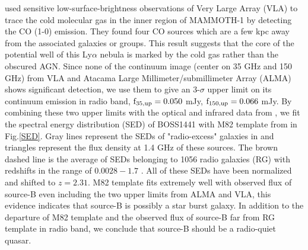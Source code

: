 \cite{emonts2019cold} used sensitive low-surface-brightness observations of Very Large Array (VLA) to trace the cold molecular gas in the inner region of MAMMOTH-1 by detecting the CO (1-0) emission. They found four CO sources which are a few kpc away from the associated galaxies or groups. This result suggests that the core of the potential well of this Ly$\alpha$ nebula is marked by the cold gas rather than the obscured AGN. Since none of the continuum image (center on 35 GHz and 150 GHz) from VLA and Atacama Large Millimeter/submillimeter Array (ALMA) shows significant detection, we use them to give an 3-$\sigma$ upper limit on its continuum emission in radio band, $\rm f_{35,up}=0.050$ mJy, $\rm f_{150,up}=0.066$ mJy. By combining these two upper limits with the optical and infrared data from \citet{arrigoni2018overdensity}, we fit the spectral energy distribution (SED) of BOSS1441 with M82 template from \cite{Silva_1998} in Fig.\ref{SED}. Gray lines represent the SEDs of "radio-excess" galaxies in \citet{harrison2014kiloparsec} and triangles represent the flux density at 1.4 GHz of these sources. The brown dashed line is the average of SEDs belonging to 1056 radio galaxies (RG) with redshifts in the range of $0.0028-1.7$ \citep{Toba_2019}. All of these SEDs have been normalized and shifted to $z=2.31$. M82 template fits extremely well with observed flux of source-B even including the two upper limits from ALMA and VLA, this evidence indicates that source-B is possibly a star burst galaxy. In addition to the departure of M82 template and the observed flux of source-B far from RG template in radio band, we conclude that source-B should be a radio-quiet quasar.
	
